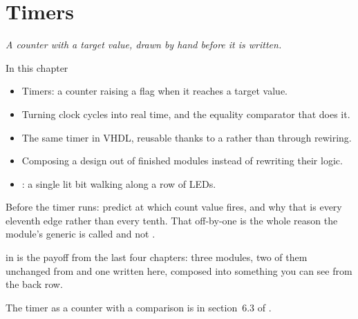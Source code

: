 
\chapter{Timers}
\label{c7:ch}

{\large\itshape A counter with a target value, drawn by hand before it is written.\par}

\begin{chapterbox}{In this chapter}
\begin{itemize}
  \item Timers: a counter raising a flag when it reaches a target value.
  \item Turning clock cycles into real time, and the equality comparator that does it.
  \item The same timer in VHDL, reusable thanks to a  rather than through rewiring.
  \item Composing a design out of finished modules instead of rewriting their logic.
  \item {}: a single lit bit walking along a row of LEDs.
\end{itemize}
\end{chapterbox}

Before the timer runs: predict at which count value  fires, and why that is every
eleventh edge rather than every tenth. That off-by-one is the whole reason the module's generic is
called  and not .

 in  is the payoff from the last four chapters: three
modules, two of them unchanged from  and one written here, composed into something
you can see from the back row.

\note[Refresher] The timer as a counter with a comparison is in section~6.3 of \debook{}.




